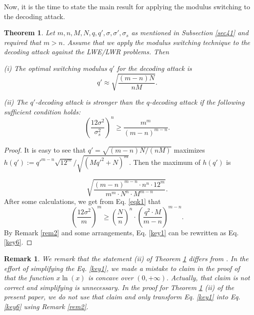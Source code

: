 \documentclass{cta-author}
\newtheorem{theorem}{Theorem}{}
\newtheorem{remark}{Remark}{}
\begin{document}
Now, it is the time to state the main result for applying the modulus switching to the decoding attack.

\begin{theorem} \label{theorem3} Let $m, n, M, N, q, q', \sigma, \sigma', \sigma_s$ as mentioned in Subsection \ref{sec41} and required that $m>n$. Assume that we apply the modulus switching technique to the decoding attack against the LWE/LWR problems. Then
	
	(i) The optimal switching modulus $q'$ for the decoding attack is
	\begin{equation} \label{eq26}
	q' \approx \sqrt{\frac{(m-n)N}{nM}}.
	\end{equation}
	
	(ii) The $q'$-decoding attack is stronger than the $q$-decoding attack if the following sufficient condition holds: 
		\begin{equation}\label{key6}
	\left(\frac{12\sigma^2}{\sigma_s^2}\right)^{n} \geq\frac{m^m}{(m-n)^{m-n}}.
		\end{equation}

\end{theorem}
\begin{proof}

It is easy to see that $q'= \sqrt{(m-n)N/(nM)}$ maximizes $h(q'):=q'^{m-n}\sqrt{12^m}/\sqrt{(Mq'^2+N)^m}$. Then the maximum of $h(q')$ is 

$$\sqrt{\frac{(m-n)^{m-n} \cdot n^n \cdot 12^m}{m^m \cdot N^n \cdot M^{m-n}}}.$$
After some calculations, we get from Eq. \eqref{eqk1} that 
\begin{equation}\label{key1}
	\left(\frac{12\sigma^2}{m}\right)^{m} \geq \left( \frac{N}{n}\right)^{n} \cdot \left(\frac{ q^{2} \cdot M}{m-n} \right)^{m-n}.
\end{equation}
By Remark \ref{rem2} and some arrangements, Eq. \eqref{key1} can be rewritten as Eq. \eqref{key6}.

\end{proof}

\begin{remark}
We remark that the statement (ii) of Theorem \ref{theorem3} differs from \cite[Theorem 2 (ii)]{LMDY18}. In the effort of simplifying the Eq. \eqref{key1},  we made a mistake to claim in the proof of \cite[Theorem 2 (ii)]{LMDY18} that the function $x \ln(x)$ is concave over $(0,+\infty)$. Actually, that claim is  not correct and simplifying is unnecessary. In the proof for Theorem \ref{theorem3} (ii) of the present paper, we do not use that claim and only transform Eq. \eqref{key1} into Eq. \eqref{key6} using Remark \ref{rem2}.
\end{remark}
\end{document}
